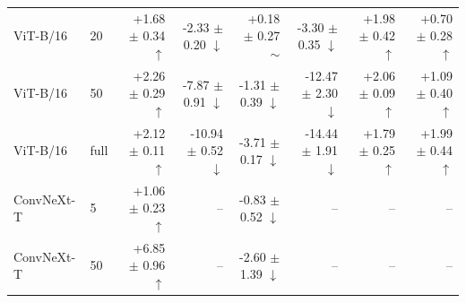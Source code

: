 \begin{table}[H]
{\begin{tabular}{llrrrrrr}
ViT-B/16 & 20 & +1.68 $\pm$ 0.34 $\uparrow$ & -2.33 $\pm$ 0.20 $\downarrow$ & +0.18 $\pm$ 0.27 $\sim$ & -3.30 $\pm$ 0.35 $\downarrow$ & +1.98 $\pm$ 0.42 $\uparrow$ & +0.70 $\pm$ 0.28 $\uparrow$ \\
ViT-B/16 & 50 & +2.26 $\pm$ 0.29 $\uparrow$ & -7.87 $\pm$ 0.91 $\downarrow$ & -1.31 $\pm$ 0.39 $\downarrow$ & -12.47 $\pm$ 2.30 $\downarrow$ & +2.06 $\pm$ 0.09 $\uparrow$ & +1.09 $\pm$ 0.40 $\uparrow$ \\
ViT-B/16 & full & +2.12 $\pm$ 0.11 $\uparrow$ & -10.94 $\pm$ 0.52 $\downarrow$ & -3.71 $\pm$ 0.17 $\downarrow$ & -14.44 $\pm$ 1.91 $\downarrow$ & +1.79 $\pm$ 0.25 $\uparrow$ & +1.99 $\pm$ 0.44 $\uparrow$ \\
\midrule
ConvNeXt-T & 5 & +1.06 $\pm$ 0.23 $\uparrow$ & -- & -0.83 $\pm$ 0.52 $\downarrow$ & -- & -- & -- \\
ConvNeXt-T & 50 & +6.85 $\pm$ 0.96 $\uparrow$ & -- & -2.60 $\pm$ 1.39 $\downarrow$ & -- & -- & -- \\
\bottomrule
\end{tabular}}
\end{table}
